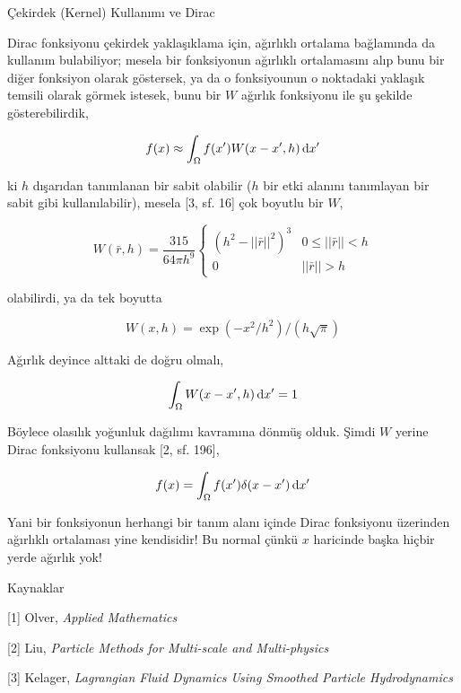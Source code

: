 \documentclass[12pt,fleqn]{article}\usepackage{../../common}
\begin{document}
Çekirdek (Kernel) Kullanımı ve Dirac

Dirac fonksiyonu çekirdek yaklaşıklama için, ağırlıklı ortalama bağlamında da
kullanım bulabiliyor; mesela bir fonksiyonun ağırlıklı ortalamasını alıp bunu
bir diğer fonksiyon olarak göstersek, ya da o fonksiyounun o noktadaki yaklaşık
temsili olarak görmek istesek, bunu bir $W$ ağırlık fonksiyonu ile şu şekilde
gösterebilirdik,

$$
f(x) \approx \int_\Omega f(x') W(x-x',h) \,\mathrm{d} x'
$$

ki $h$ dışarıdan tanımlanan bir sabit olabilir ($h$ bir etki alanını tanımlayan
bir sabit gibi kullanılabilir), mesela [3, sf. 16] çok boyutlu bir $W$,


$$
W(\bar{r},h) = \frac{315}{64 \pi h^9}
\left\{ \begin{array}{ll}
(h^2 - ||\bar{r}||^2)^3 & 0 \le ||\bar{r}|| < h \\
0 & ||\bar{r}|| > h
\end{array} \right.
$$

olabilirdi, ya da tek boyutta

$$
W(x,h) = \exp (-x^2 / h^2) / (h\sqrt{\pi})
$$

Ağırlık deyince alttaki de doğru olmalı,

$$
\int_\Omega  W(x-x',h) \,\mathrm{d} x' = 1
$$

Böylece olasılık yoğunluk dağılımı kavramına dönmüş olduk. Şimdi $W$ yerine
Dirac fonksiyonu kullansak [2, sf. 196],

$$
f(x) = \int_\Omega f(x') \delta(x-x') \,\mathrm{d} x'
$$

Yani bir fonksiyonun herhangi bir tanım alanı içinde Dirac fonksiyonu üzerinden
ağırlıklı ortalaması yine kendisidir! Bu normal çünkü $x$ haricinde başka hiçbir
yerde ağırlık yok!


Kaynaklar 

[1] Olver, {\em Applied Mathematics}

[2] Liu, {\em Particle Methods for Multi-scale and Multi-physics}

[3] Kelager, {\em Lagrangian Fluid Dynamics Using Smoothed Particle Hydrodynamics}
\end{document}
